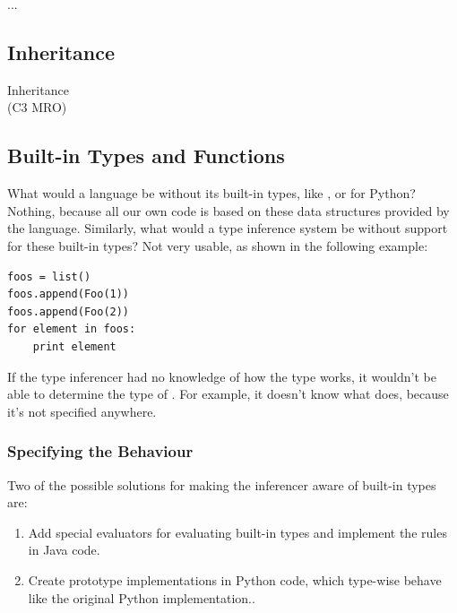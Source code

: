 \documentclass[12pt,halfparskip,DIV11,BCOR10mm]{scrreprt}
\begin{document}
... \cite{ddp}


\subsection{Inheritance}


Inheritance\\
 (C3 MRO)

\subsection{Built-in Types and Functions}

What would a language be without its built-in types, like ,  or  for Python? Nothing, because all our own code is based on these data structures provided by the language. Similarly, what would a type inference system be without support for these built-in types? Not very usable, as shown in the following example:

\begin{lstlisting}
foos = list()
foos.append(Foo(1))
foos.append(Foo(2))
for element in foos:
    print element
\end{lstlisting}

If the type inferencer had no knowledge of how the  type works, it wouldn't be able to determine the type of . For example, it doesn't know what  does, because it's not specified anywhere.

\subsubsection{Specifying the Behaviour}

Two of the possible solutions for making the inferencer aware of built-in types are:

\begin{enumerate}
	\item Add special evaluators for evaluating built-in types and implement the rules in Java code.
	\item Create prototype implementations in Python code, which type-wise behave like the original Python implementation..
\end{enumerate}

\end{document}
